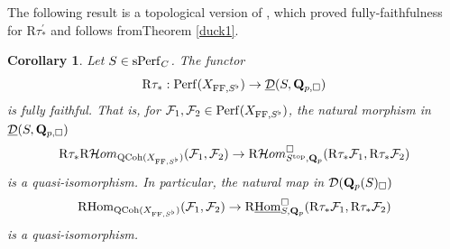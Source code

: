 \documentclass[10pt]{amsart}
\let\cal\mathcal
\newtheorem{corollary}[equation]{Corollary}
\theoremstyle{definition}
\theoremstyle{remark}
\newcommand{\Hom}{{\rm{Hom}} }
\newcommand{\uHom}{\underline{{\rm{Hom}} }}
\newcommand{\Hhom}{{\cal Hom}}
\newcommand{\FF}{\operatorname{FF} }
\newcommand{\sff}{{\mathcal{F}}}
\newcommand{\sd}{{\mathcal{D}}}
\numberwithin{equation}{section}
\def\R{{\mathrm R}}
\def\Q{{\bf Q}} \def\Z{{\bf Z}}
\numberwithin{equation}{section}
\begin{document}
    The following result is a topological version of  \cite[Cor. 3.10]{AnLB}, which proved fully-faithfulness for $\R\tau^{\prime}_*$ and follows fromTheorem \ref{duck1}.
\begin{corollary}\label{lebrasII}
Let $S\in {\rm sPerf}_C$.  The functor 
$$
\R\tau_*: {\rm Perf}(X_{\FF, S^{\flat}})\to \underline{\sd}(S,\Q_{p,\Box})
$$
is fully faithful. That is, for $\sff_1,\sff_2\in {\rm Perf}(X_{\FF, S^{\flat}})$, the natural morphism in $\underline{\sd}(S,\Q_{p,\Box})$
$$\R\tau_*\R\Hhom_{{\rm QCoh}(X_{\FF,S^{\flat}})}(\sff_1,\sff_2)\to \R\Hhom^{\Box}_{S^{\rm top},\Q_{p}}(\R\tau_*\sff_1,\R\tau_*\sff_2)
$$
is a quasi-isomorphism. In particular,  the natural map in ${\sd}(\Q_p(S)_{\Box})$
$$
\R\Hom_{{\rm QCoh}(X_{\FF,S^{\flat}})}(\sff_1,\sff_2)\to \R\uHom^{\Box}_{S,\Q_{p}}(\R\tau_*\sff_1,\R\tau_*\sff_2)
$$
is a quasi-isomorphism. 
\end{corollary}
\end{document}
